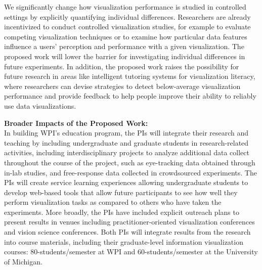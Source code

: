 \documentclass[11pt]{article}
\begin{document}
\noindent We significantly change how visualization performance is studied in controlled settings by explicitly quantifying individual differences.
Researchers are already incentivized to conduct controlled visualization studies, for example to evaluate competing visualization techniques or to examine how particular data features influence a users' perception and performance with a given visualization.
The proposed work will lower the barrier for investigating individual differences in future experiments.
In addition, the proposed work raises the possibility for future research in areas like intelligent tutoring systems for visualization literacy, where researchers can devise strategies to detect below-average visualization performance and provide feedback to help people improve their ability to reliably use data visualizations.


\noindent\textbf{Broader Impacts of the Proposed Work:}
\\
In building WPI's education program, the PIs will integrate their research and teaching by including undergraduate and graduate students in research-related activities, including interdisciplinary projects to analyze additional data collect throughout the course of the project, such as eye-tracking data obtained through in-lab studies, and free-response data collected in crowdsourced experiments.
The PIs will create service learning experiences allowing undergraduate students to develop web-based tools that allow future participants to see how well they perform visualization tasks as compared to others who have taken the experiments.
More broadly, the PIs have included explicit outreach plans to present results in venues including practitioner-oriented visualization conferences and vision science conferences. Both PIs will integrate results from the research into course materials, including their graduate-level information visualization courses: 80-students/semester at WPI and 60-students/semester at the University of Michigan.
\end{document}
